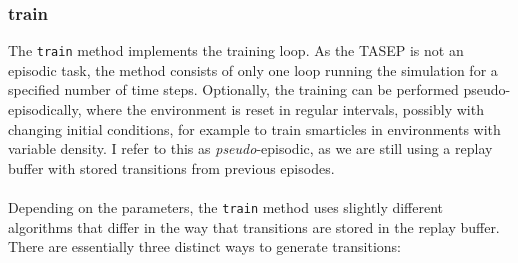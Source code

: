 \subsubsection{train}
\label{subsubsec:implementation-train}
The \texttt{train} method implements the training loop. As the TASEP is not an episodic task, the method consists of only one loop running the simulation for a specified number of time steps. Optionally, the training can be performed pseudo-episodically, where the environment is reset in regular intervals, possibly with changing initial conditions, for example to train smarticles in environments with variable density. I refer to this as \textit{pseudo}-episodic, as we are still using a replay buffer with stored transitions from previous episodes.
\\
\\
Depending on the parameters, the \texttt{train} method uses slightly different algorithms that differ in the way that transitions are stored in the replay buffer. There are essentially three distinct ways to generate transitions:
